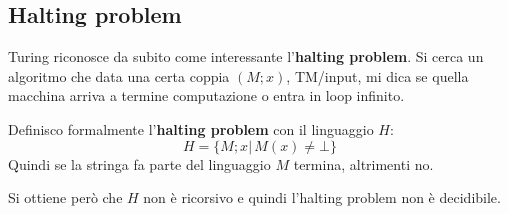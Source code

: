 \subsection{Halting problem}
Turing riconosce da subito come interessante l'\textbf{halting problem}. Si
cerca un algoritmo che data una certa coppia $(M;x)$, TM/input, mi dica se
quella macchina arriva a termine computazione o entra in loop infinito.
\begin{definizione}
  Definisco formalmente l'\textbf{halting problem} con il linguaggio $H$:
  \[H=\{M;x|\,M(x)\neq\bot\}\]
  Quindi se la stringa fa parte del linguaggio $M$ termina, altrimenti no.
\end{definizione}
\begin{teorema}
  Si ottiene però che $H$ non è ricorsivo e quindi l'halting problem non è
  decidibile.
\end{teorema}
